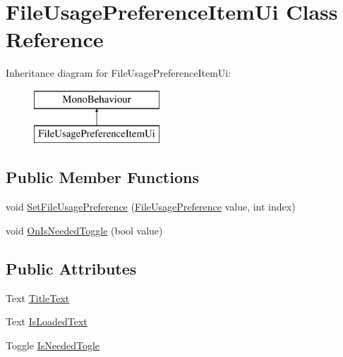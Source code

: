 \hypertarget{class_file_usage_preference_item_ui}{}\section{File\+Usage\+Preference\+Item\+Ui Class Reference}
\label{class_file_usage_preference_item_ui}
Inheritance diagram for File\+Usage\+Preference\+Item\+Ui\+:\begin{figure}[H]
\begin{center}
\leavevmode
\includegraphics[height=2.000000cm]{class_file_usage_preference_item_ui}
\end{center}
\end{figure}
\subsection*{Public Member Functions}
\begin{DoxyCompactItemize}
\item 
void \mbox{\hyperlink{class_file_usage_preference_item_ui_ac8e29452cd2b12b088417ff1e23d3e33}{Set\+File\+Usage\+Preference}} (\mbox{\hyperlink{class_file_usage_preference}{File\+Usage\+Preference}} value, int index)
\item 
void \mbox{\hyperlink{class_file_usage_preference_item_ui_a80a460ca8c3f5138305bd5785152024a}{On\+Is\+Needed\+Toggle}} (bool value)
\end{DoxyCompactItemize}
\subsection*{Public Attributes}
\begin{DoxyCompactItemize}
\item 
Text \mbox{\hyperlink{class_file_usage_preference_item_ui_a51179156a86c0980fd228264d8c7acd0}{Title\+Text}}
\item 
Text \mbox{\hyperlink{class_file_usage_preference_item_ui_a386a29774b430691d60023ab5d25184b}{Is\+Loaded\+Text}}
\item 
Toggle \mbox{\hyperlink{class_file_usage_preference_item_ui_a19a392fb3640c0767bd4924fdc837f85}{Is\+Needed\+Togle}}
\end{DoxyCompactItemize}


